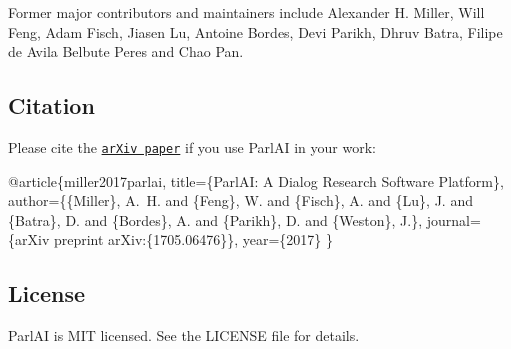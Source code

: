 Former major contributors and maintainers include Alexander H. Miller, Will Feng, Adam Fisch, Jiasen Lu, Antoine Bordes, Devi Parikh, Dhruv Batra, Filipe de Avila Belbute Peres and Chao Pan.

\subsection*{Citation}

Please cite the \href{https://arxiv.org/abs/1705.06476}{\tt ar\+Xiv paper} if you use Parl\+AI in your work\+:


\begin{DoxyCode}
@article\{miller2017parlai,
  title=\{ParlAI: A Dialog Research Software Platform\},
  author=\{\{Miller\}, A.~H. and \{Feng\}, W. and \{Fisch\}, A. and \{Lu\}, J. and \{Batra\}, D. and \{Bordes\}, A. and
       \{Parikh\}, D. and \{Weston\}, J.\},
  journal=\{arXiv preprint arXiv:\{1705.06476\}\},
  year=\{2017\}
\}
\end{DoxyCode}


\subsection*{License}

Parl\+AI is M\+IT licensed. See the L\+I\+C\+E\+N\+SE file for details. 
